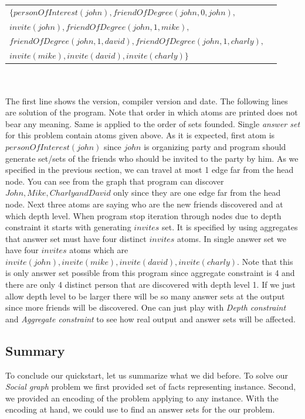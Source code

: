 \documentclass[14pt,a4paper, titlepage]{article}
\begin{document}
\begin{tabular}{ l r }
   $\mathit{\{personOfInterest(john), friendOfDegree(john,0,john), }$& \\
   $\mathit{invite(john), friendOfDegree(john,1,mike),}$& \\
   $\mathit{friendOfDegree(john,1,david), friendOfDegree(john,1,charly),}$ & \\
   $\mathit{invite(mike),invite(david),invite(charly)\}}$
 \end{tabular}
\\ \\
The first line shows the \dlvhex{} version, compiler version and date. The following lines
are solution of the program. Note that order in which atoms are printed does not bear any meaning. 
Same is applied to the order of sets founded. Single \emph{answer set} for this problem contain 
atoms given above. As it is expected, first atom is $\mathit{personOfInterest(john)}$ 
since $\mathit{john}$ is organizing party and program should generate set/sets of the friends 
who should be invited to the party by him. As we specified in the previous section,
we can travel at most 1 edge far from the head node. You can see from the graph that program 
can discover $\mathit{John, Mike, Charly and David}$ only since they are one edge far from the 
head node. Next three atoms are saying who are the new friends discovered and at which depth 
level. When program stop iteration through nodes due to depth constraint it starts with generating 
$\mathit{invites}$ set. It is specified by using aggregates that answer set must have four distinct $\mathit{invites}$ atoms.
In single answer set we have four $\mathit{invites}$ atoms which are $\mathit{invite(john), 
invite(mike), invite(david), invite(charly)}$. Note that this is only answer set possible 
from this program since aggregate constraint is 4 and there are only 4 distinct person that are discovered with depth level 1. If we just allow depth level to be larger there will be so many answer sets at the output since more friends will be discovered. One can just play with \emph{Depth constraint} and \emph{Aggregate constraint} to see how real output and answer sets will be affected.    

\subsection{Summary}
To conclude our quickstart, let us summarize what we did before. To solve our \emph{Social graph} problem we first provided set of facts representing instance. Second, we provided an encoding of the problem applying to any instance. With the encoding at hand, we could use \dlvhex{} to find an answer sets for the our problem. 
\end{document}
